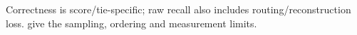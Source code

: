 Correctness is score/tie-specific; raw recall also includes routing/reconstruction loss.  give the sampling, ordering and measurement limits.